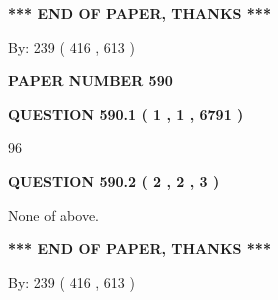 \documentclass[12pt]{article}
\begin{document}
\vspace{1.0in} 
{\textbf{\large{ *** END OF PAPER, THANKS *** }}} 
   
   
\hspace{1.0in} By: 
 239 ( 416 ,  613 )
   
   
   
   
\newpage 
\setcounter{page}{ 
   590001 } 
   
   
   
   
 {\textbf{ \Large{ PAPER NUMBER  590  }}}
   
   
\vspace{0.2in}
   
   
   
   
   
   
 \vspace{0.2in}
 
 
 
 
   
   
  
\vspace{0.2in}
  
{\textbf{\Large{QUESTION
590.1 
 ( 1 , 1 , 6791 )
}}}
  
  
 
 
\noindent{}

96
 
 
  
\vspace{0.2in}
  
{\textbf{\Large{QUESTION
590.2 
 ( 2 , 2 , 3 )
}}}
  
  
 
 
\noindent{}
 
 
 None of above.
 
 
 
 
   
   
 \vspace{0.2in}
 
   
   
   
   
\vspace{1.0in} 
{\textbf{\large{ *** END OF PAPER, THANKS *** }}} 
   
   
\hspace{1.0in} By: 
 239 ( 416 ,  613 )
   
\end{document}
